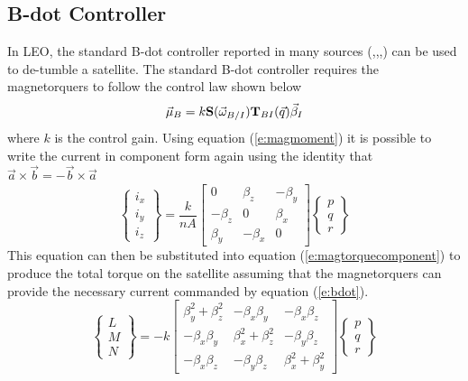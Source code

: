 \documentclass{article}
\begin{document}
\subsection{B-dot Controller}

In LEO, the standard B-dot controller reported in many sources
(\cite{Leomanni2012},\cite{Lovera2015},\cite{WInstitute},\cite{SanyalDick})
can be used to de-tumble a satellite. The standard B-dot controller
requires the magnetorquers to follow the control law shown below
\begin{equation}\label{e:bdotcompact}
  \vec{\mu}_B = k{\bf S}(\vec{\omega}_{B/I}){\bf T}_{BI}(\vec{q})\vec{\beta}_I
\end{equation}
where $k$ is the control gain. Using equation (\ref{e:magmoment}) it
is possible to write the current in component form again
using the identity that $\vec{a}\times\vec{b}=-\vec{b}\times\vec{a}$
\begin{equation}\label{e:bdot}
  \begin{Bmatrix} i_{x}
    \\ i_{y} \\ i_{z} \end{Bmatrix} = \frac{k}{nA}\begin{bmatrix} 0 & \beta_z & -\beta_y \\ -\beta_z & 0 &
  \beta_x \\ \beta_y & -\beta_x & 0 \end{bmatrix}\begin{Bmatrix} p
    \\ q \\ r \end{Bmatrix}
\end{equation}
This equation can then be substituted into equation
(\ref{e:magtorquecomponent}) to produce the total torque on the
satellite assuming that the magnetorquers can provide the necessary
current commanded by equation (\ref{e:bdot}).
\begin{equation}\label{e:bdotfinal}
  \begin{Bmatrix} L \\ M \\ N \end{Bmatrix} = -k \begin{bmatrix}
    \beta_y^2 + \beta_z^2 & -\beta_x\beta_y & -\beta_x\beta_z
    \\ -\beta_x\beta_y & \beta_x^2 + \beta_z^2 & -\beta_y\beta_z \\
    -\beta_x\beta_z & -\beta_y\beta_z & \beta_x^2 +
    \beta_y^2 \end{bmatrix} \begin{Bmatrix} p
    \\ q \\ r \end{Bmatrix} 
\end{equation}
\end{document}

